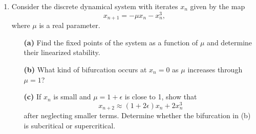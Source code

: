\documentclass[10pt,letterpaper]{report}
\begin{document}
\begin{enumerate}
\item\begin{qbox}
Consider the discrete dynamical system with iterates $x_n$ given by the map
\[
x_{n+1} = -\mu x_n - x_n^3,
\]
where $\mu$ is a real parameter.
\begin{itemize}
    \item[\textbf{(a)}] Find the fixed points of the system as a function of $\mu$ and determine their linearized stability.
    \item[\textbf{(b)}] What kind of bifurcation occurs at $x_n = 0$ as $\mu$ increases through $\mu = 1$?
    \item[\textbf{(c)}] If $x_n$ is small and $\mu = 1+\epsilon$ is close to 1, show that
    \[
    x_{n+2} \approx (1+2\epsilon)x_n + 2x_n^3
    \]
    after neglecting smaller terms. Determine whether the bifurcation in (b) is subcritical or supercritical.
\end{itemize}
\end{qbox}


\end{enumerate}
\end{document}
